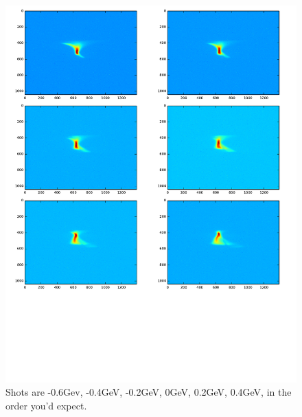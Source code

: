 \documentclass[aps,prl,twocolumn,groupedaddress]{revtex4}
\begin{document}
\begin{figure}
\includegraphics[scale=0.3,page=1]{output.pdf}
\caption{Shots are -0.6Gev, -0.4GeV, -0.2GeV, 0GeV, 0.2GeV, 0.4GeV, in the order you'd expect.}
\end{figure}
\end{document}
